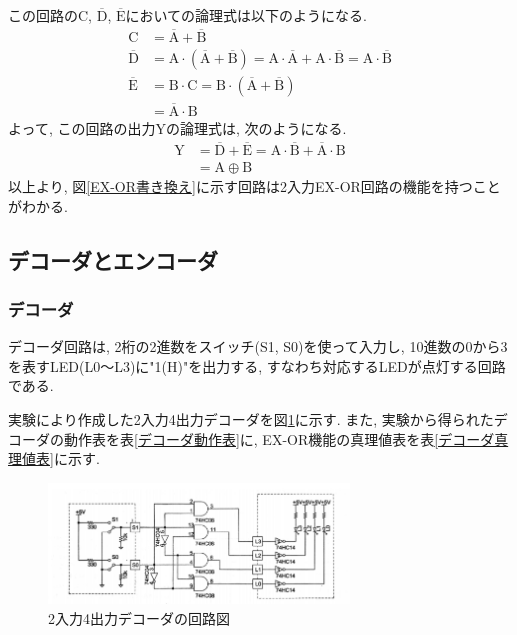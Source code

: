 \documentclass[a4paper, 11pt, uplatex]{jsarticle}
\begin{document}
この回路のC, $\overline{\mathrm{D}}$, $\overline{\mathrm{E}}$においての論理式は以下のようになる.
\begin{align}
  \mathrm{C} &= \overline{\mathrm{A}} + \overline{\mathrm{B}} \\
  \overline{\mathrm{D}} & = \mathrm{A} \cdot (\overline{\mathrm{A}} + \overline{\mathrm{B}})
  = \mathrm{A} \cdot \overline{\mathrm{A}} + \mathrm{A} \cdot \overline{\mathrm{B}} = \mathrm{A} \cdot \overline{\mathrm{B}}\\
  \overline{\mathrm{E}} &= \mathrm{B} \cdot \mathrm{C} = \mathrm{B} \cdot (\overline{\mathrm{A}} + \overline{\mathrm{B}})
  \\ &= \overline{\mathrm{A}} \cdot \mathrm{B}
\end{align}
よって, この回路の出力Yの論理式は, 次のようになる.
\begin{align}
  \mathrm{Y} &= \overline{\mathrm{D}} + \overline{\mathrm{E}} = \mathrm{A} \cdot \overline{\mathrm{B}} + \overline{\mathrm{A}} \cdot \mathrm{B}
  \\ &= \mathrm{A} \oplus \mathrm{B}
\end{align}
以上より,  図\ref{EX-OR書き換え}に示す回路は2入力EX-OR回路の機能を持つことがわかる.

\subsection{デコーダとエンコーダ}
\subsubsection{デコーダ}
デコーダ回路は,  2桁の2進数をスイッチ(S1, S0)を使って入力し,  10進数の0から3を表すLED(L0〜L3)に"1(H)"を出力する,  すなわち対応するLEDが点灯する回路である.

\par

実験により作成した2入力4出力デコーダを図\ref{デコーダ}に示す.
また,  実験から得られたデコーダの動作表を表\ref{デコーダ動作表}に,  EX-OR機能の真理値表を表\ref{デコーダ真理値表}に示す.

\begin{figure}[H]
  \begin{center}
    \includegraphics[width = 8cm]{画像/デコーダ.png}
    \caption{2入力4出力デコーダの回路図}
    \label{デコーダ}
  \end{center}
\end{figure}
\end{document}
